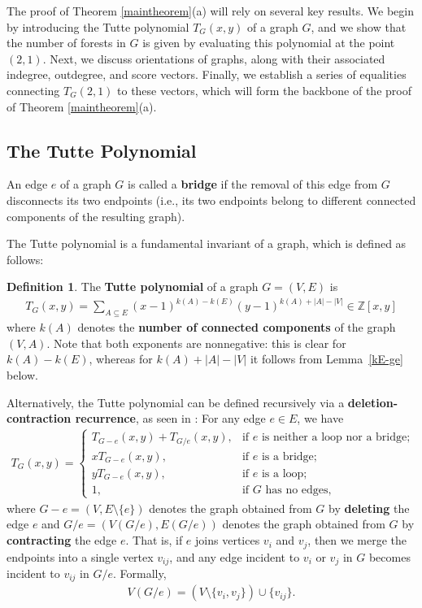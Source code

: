 \documentclass[12pt]{article}
\theoremstyle{definition}
\newtheorem{definition}[theorem]{Definition}
\theoremstyle{remark}
\newcommand{\ZZ}{\mathbb{Z}} %
\begin{document}
The proof of Theorem \ref{maintheorem}(a) will rely on several key results. We begin by introducing the Tutte polynomial $T_G(x,y)$ of a graph $G$, and we show that the number of forests in $G$ is given by evaluating this polynomial at the point $(2,1)$. Next, we discuss orientations of graphs, along with their associated indegree, outdegree, and score vectors. Finally, we establish a series of equalities connecting $T_G(2,1)$ to these vectors, which will form the backbone of the proof of Theorem \ref{maintheorem}(a).

\subsection{The Tutte Polynomial}

An edge $e$ of a graph $G$ is called a \textbf{bridge} if the removal of this edge from $G$ disconnects its two endpoints (i.e., its two endpoints belong to different connected components of the resulting graph).

The Tutte polynomial is a fundamental invariant of a graph, which is defined as follows:

\begin{definition}
    The \textbf{Tutte polynomial} of a graph $G=(V,E)$ is
    \begin{align*}
        T_G(x,y) = \sum_{A \subseteq E}(x-1)^{k(A)-k(E)}(y-1)^{k(A)+|A|-|V|}
        \in \ZZ[x,y]
    \end{align*}
    where $k(A)$ denotes the \textbf{number of connected components} of the graph $(V,A)$.
	Note that both exponents are nonnegative: this is clear for $k(A)-k(E)$, whereas for $k(A)+|A|-|V|$ it follows from Lemma~\ref{kE-ge} below.

    Alternatively, the Tutte polynomial can be defined recursively via a \textbf{deletion-contraction recurrence}, as seen in \cite[Theorem 6.2.2 and (6.13)]{BrylawskiOxley1992}:
	For any edge $e \in E$, we have
    \begin{align}
        T_G(x,y) = \begin{cases}
            T_{G-e}(x,y) + T_{G/e}(x,y), & \text{if $e$ is neither a loop nor a bridge;} \\
            xT_{G-e}(x,y), & \text{if $e$ is a bridge;} \\
            yT_{G-e}(x,y), & \text{if $e$ is a loop;} \\
            1, & \text{if $G$ has no edges,}
        \end{cases}
		\label{eq.tutte.dc}
    \end{align}
    where $G-e = (V,E\setminus \{e\})$ denotes the graph obtained from $G$ by \textbf{deleting} the edge $e$ and $G/e = (V(G/e),E(G/e))$ denotes the graph obtained from $G$ by \textbf{contracting} the edge $e$. That is, if $e$ joins vertices $v_i$ and $v_j$, then we merge the endpoints into a single vertex $v_{ij}$, and any edge incident to $v_i$ or $v_j$ in $G$ becomes incident to $v_{ij}$ in $G/e$. Formally, \begin{align*}
        V(G/e) = (V \setminus \{v_i,v_j\}) \cup \{v_{ij}\}.
    \end{align*}
\end{definition}
\end{document}
